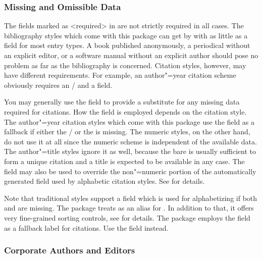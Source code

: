 \documentclass{ltxdockit}[2011/03/25]
\newcommand*{\biblatex}{\sty{biblatex}\xspace}
\begin{document}
\subsubsection{Missing and Omissible Data}
\label{bib:use:key}

The fields marked as <required> in  are not strictly required in all cases. The bibliography styles which come with this package can get by with as little as a  field for most entry types. A book published anonymously, a periodical without an explicit editor, or a software manual without an explicit author should pose no problem as far as the bibliography is concerned. Citation styles, however, may have different requirements. For example, an author"=year citation scheme obviously requires an \slash {} and a  field.

You may generally use the  field to provide a substitute for any missing data required for citations. How the  field is employed depends on the citation style. The author"=year citation styles which come with this package use the  field as a fallback if either the \slash {} or the  is missing. The numeric styles, on the other hand, do not use it at all since the numeric scheme is independent of the available data. The author"=title styles ignore it as well, because the bare  is usually sufficient to form a unique citation and a title is expected to be available in any case. The  field may also be used to override the non"=numeric portion of the automatically generated  field used by alphabetic citation styles. See  for details.

Note that traditional \bibtex styles support a  field which is used for alphabetizing if both  and  are missing. The \biblatex package treats  as an alias for . In addition to that, it offers very fine-grained sorting controls, see  for details. The  package employs the  field as a fallback label for citations. Use the  field instead.

\subsubsection{Corporate Authors and Editors}
\label{bib:use:inc}
\end{document}
